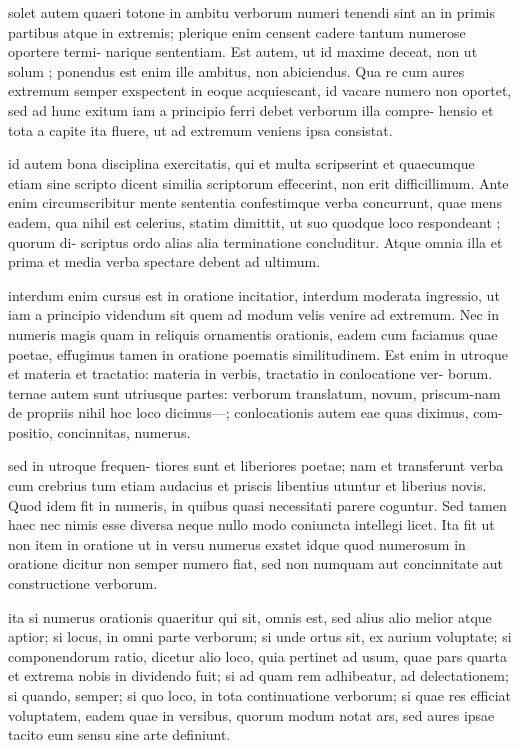  solet autem quaeri totone in ambitu verborum numeri tenendi sint an in primis partibus atque in extremis; plerique enim censent cadere tantum numerose oportere termi- narique sententiam. Est autem, ut id maxime deceat, non ut solum ; ponendus est enim ille ambitus, non abiciendus. Qua re cum aures extremum semper exspectent in eoque acquiescant, id vacare numero non oportet, sed ad hunc exitum iam a principio ferri debet verborum illa compre- hensio et tota a capite ita fluere, ut ad extremum veniens ipsa consistat.

 id autem bona disciplina exercitatis, qui et multa scripserint et quaecumque etiam sine scripto dicent similia scriptorum effecerint, non erit difficillimum. Ante enim circumscribitur mente sententia confestimque verba concurrunt, quae mens eadem, qua nihil est celerius, statim dimittit, ut suo quodque loco respondeant ; quorum di- scriptus ordo alias alia terminatione concluditur. Atque omnia illa et prima et media verba spectare debent ad ultimum.

 interdum enim cursus est in oratione incitatior, interdum moderata ingressio, ut iam a principio videndum sit quem ad modum velis venire ad extremum. Nec in numeris magis quam in reliquis ornamentis orationis, eadem cum faciamus quae poetae, effugimus tamen in oratione poematis similitudinem. Est enim in utroque et materia et tractatio: materia in verbis, tractatio in conlocatione ver- borum. ternae autem sunt utriusque partes: verborum translatum, novum, priscum-nam de propriis nihil hoc loco dicimus—; conlocationis autem eae quas diximus, com- positio, concinnitas, numerus.

 sed in utroque frequen- tiores sunt et liberiores poetae; nam et transferunt verba cum crebrius tum etiam audacius et priscis libentius utuntur et liberius novis. Quod idem fit in numeris, in quibus quasi necessitati parere coguntur. Sed tamen haec nec nimis esse diversa neque nullo modo coniuncta intellegi licet. Ita fit ut non item in oratione ut in versu numerus exstet idque quod numerosum in oratione dicitur non semper numero fiat, sed non numquam aut concinnitate aut constructione verborum.

 ita si numerus orationis quaeritur qui sit, omnis est, sed alius alio melior atque aptior; si locus, in omni parte verborum; si unde ortus sit, ex aurium voluptate; si componendorum ratio, dicetur alio loco, quia pertinet ad usum, quae pars quarta et extrema nobis in dividendo fuit; si ad quam rem adhibeatur, ad delectationem; si quando, semper; si quo loco, in tota continuatione verborum; si quae res efficiat voluptatem, eadem quae in versibus, quorum modum notat ars, sed aures ipsae tacito eum sensu sine arte definiunt.

